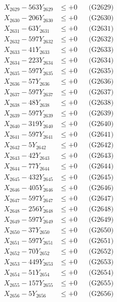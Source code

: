 \documentclass[a4paper,10pt]{article}
\begin{document}
{\begin{align}
X_{2629} - 563Y_{2629} &\leq +0 && \text{(G2629)} \\
X_{2630} - 206Y_{2630} &\leq +0 && \text{(G2630)} \\
\allowbreak
X_{2631} - 63Y_{2631} &\leq +0 && \text{(G2631)} \\
X_{2632} - 597Y_{2632} &\leq +0 && \text{(G2632)} \\
X_{2633} - 41Y_{2633} &\leq +0 && \text{(G2633)} \\
X_{2634} - 223Y_{2634} &\leq +0 && \text{(G2634)} \\
X_{2635} - 597Y_{2635} &\leq +0 && \text{(G2635)} \\
X_{2636} - 57Y_{2636} &\leq +0 && \text{(G2636)} \\
X_{2637} - 597Y_{2637} &\leq +0 && \text{(G2637)} \\
X_{2638} - 48Y_{2638} &\leq +0 && \text{(G2638)} \\
X_{2639} - 597Y_{2639} &\leq +0 && \text{(G2639)} \\
X_{2640} - 319Y_{2640} &\leq +0 && \text{(G2640)} \\
\allowbreak
X_{2641} - 597Y_{2641} &\leq +0 && \text{(G2641)} \\
X_{2642} - 5Y_{2642} &\leq +0 && \text{(G2642)} \\
X_{2643} - 42Y_{2643} &\leq +0 && \text{(G2643)} \\
X_{2644} - 77Y_{2644} &\leq +0 && \text{(G2644)} \\
X_{2645} - 432Y_{2645} &\leq +0 && \text{(G2645)} \\
X_{2646} - 405Y_{2646} &\leq +0 && \text{(G2646)} \\
X_{2647} - 597Y_{2647} &\leq +0 && \text{(G2647)} \\
X_{2648} - 256Y_{2648} &\leq +0 && \text{(G2648)} \\
X_{2649} - 597Y_{2649} &\leq +0 && \text{(G2649)} \\
X_{2650} - 37Y_{2650} &\leq +0 && \text{(G2650)} \\
\allowbreak
X_{2651} - 597Y_{2651} &\leq +0 && \text{(G2651)} \\
X_{2652} - 70Y_{2652} &\leq +0 && \text{(G2652)} \\
X_{2653} - 449Y_{2653} &\leq +0 && \text{(G2653)} \\
X_{2654} - 51Y_{2654} &\leq +0 && \text{(G2654)} \\
X_{2655} - 157Y_{2655} &\leq +0 && \text{(G2655)} \\
X_{2656} - 5Y_{2656} &\leq +0 && \text{(G2656)} \\

\end{align}}
\end{document}
